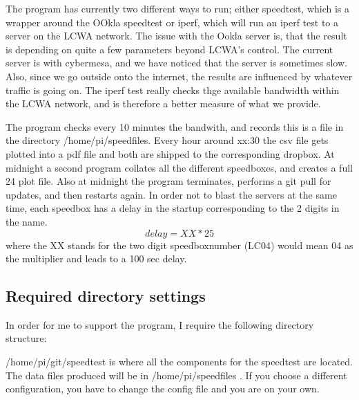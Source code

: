 \documentclass[11pt]{article}
\begin{document}
The program has currently two different ways to run; either speedtest, which is a wrapper around the OOkla speedtest  or iperf, which will run an iperf test to a server on the LCWA network. The issue with the Ookla server is, that the result is depending on quite a few parameters beyond LCWA's control. The current server is with cybermesa,
and we have noticed that the server is sometimes slow. Also, since we go outside onto the internet, the results are  influenced by whatever traffic is going on. The iperf test really checks thge available bandwidth within the LCWA network, and is therefore a better measure of what we provide.

The program checks every 10 minutes the bandwith, and records this is a file in the directory /home/pi/speedfiles. Every hour around xx:30 the csv file gets plotted into a pdf file and both are shipped to the corresponding dropbox.
At midnight a second program collates all the different speedboxes, and creates a full 24 plot file. Also at midnight the program terminates, performs a git pull for updates, and then restarts again. In order not to blast the servers at the same time, each speedbox has a delay in the startup corresponding to the 2 digits in the name.
\begin{equation}
delay = XX*25
\end{equation}
where the XX stands for the two digit speedboxnumber (LC04) would mean 04  as the multiplier and leads to a 100 sec delay.

\subsection{Required directory settings}

In order for me to support the program, I require the following directory structure:

/home/pi/git/speedtest is where all the components for the speedtest are located. The data files produced will be in /home/pi/speedfiles . If you choose a different configuration, you have to change the config file and you are on your own.
 
\end{document}
